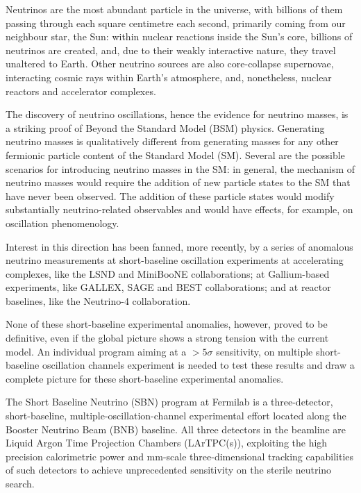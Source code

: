 

Neutrinos are the most abundant particle in the universe, with billions of them passing through each square centimetre each second, primarily coming from our neighbour star, the Sun: within nuclear reactions inside the Sun's core, billions of neutrinos are created, and, due to their weakly interactive nature, they travel unaltered to Earth. Other neutrino sources are also core-collapse supernovae, interacting cosmic rays within Earth's atmosphere, and, nonetheless, nuclear reactors and accelerator complexes. 

The discovery of neutrino oscillations, hence the evidence for neutrino masses, is a striking proof of Beyond the Standard Model (BSM) physics. 
Generating neutrino masses is qualitatively different from generating masses for any other fermionic particle content of the Standard Model (SM).  
Several are the possible scenarios for introducing neutrino masses in the SM: in general, the mechanism of neutrino masses would require the addition of new particle states to the SM that have never been observed. The addition of these particle states would modify substantially neutrino-related observables and would have effects, for example, on oscillation phenomenology. 

Interest in this direction has been fanned, more recently, by a series of anomalous neutrino measurements at short-baseline oscillation experiments at accelerating complexes, like the LSND and MiniBooNE collaborations; at Gallium-based experiments, like GALLEX, SAGE and BEST collaborations; and at reactor baselines, like the Neutrino-4 collaboration.

None of these short-baseline experimental anomalies, however, proved to be definitive, even if the global picture shows a strong tension with the current model. An individual program aiming at a $>5\sigma$ sensitivity, on multiple short-baseline oscillation channels experiment is needed to test these results and draw a complete picture for these short-baseline experimental anomalies. 

The Short Baseline Neutrino (SBN) program at Fermilab is a three-detector, short-baseline, multiple-oscillation-channel experimental effort located along the Booster Neutrino Beam (BNB) baseline. All three detectors in the beamline are Liquid Argon Time Projection Chambers (LArTPC(s)), exploiting the high precision calorimetric power and mm-scale three-dimensional tracking capabilities of such detectors to achieve unprecedented sensitivity on the sterile neutrino search. 

